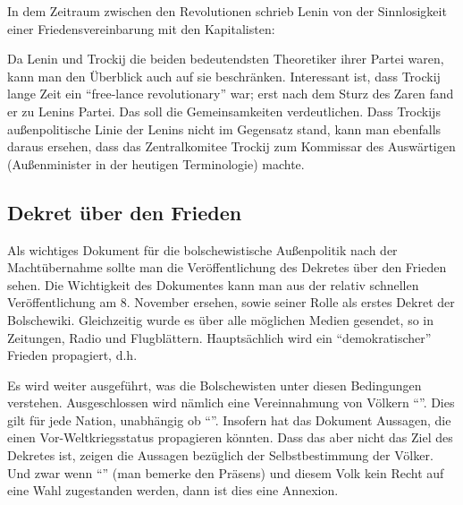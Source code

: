 \documentclass{../../sem_paper}
\begin{document}
In dem Zeitraum zwischen den Revolutionen schrieb Lenin von der Sinnlosigkeit einer Friedensvereinbarung mit den Kapitalisten:
\begin{quotation}
\autocite[97]{lenin_voj}
\end{quotation}

Da Lenin und Trockij die beiden bedeutendsten Theoretiker ihrer Partei waren, kann man den Überblick auch auf sie beschränken. Interessant ist, dass Trockij lange Zeit ein "`free-lance revolutionary"'\autocite[13]{debo1979} war; erst nach dem Sturz des Zaren fand er zu Lenins Partei. Das soll die Gemeinsamkeiten verdeutlichen. Dass Trockijs außenpolitische Linie der Lenins nicht im Gegensatz stand, kann man ebenfalls daraus ersehen, dass das Zentralkomitee Trockij zum Kommissar des Auswärtigen (Außenminister in der heutigen Terminologie) machte.

\subsection{Dekret über den Frieden}
\label{sec: dekret}
Als wichtiges Dokument für die bolschewistische Außenpolitik nach der Machtübernahme sollte man die Veröffentlichung des Dekretes über den Frieden sehen. Die Wichtigkeit des Dokumentes kann man aus der relativ schnellen Veröffentlichung am 8. November ersehen, sowie seiner Rolle als erstes Dekret der Bolschewiki. Gleichzeitig wurde es über alle möglichen Medien gesendet, so in Zeitungen, Radio und Flugblättern. Hauptsächlich wird ein "`demokratischer"' Frieden propagiert, d.h.
\begin{quotation}
\autocite[12]{dekret}
  \end{quotation}
Es wird weiter ausgeführt, was die Bolschewisten unter diesen Bedingungen verstehen. Ausgeschlossen wird nämlich eine Vereinnahmung von Völkern  "`"'\autocite[12]{dekret}. Dies gilt für jede Nation, unabhängig ob "`"'\autocite[12]{dekret}.
Insofern hat das Dokument Aussagen, die einen Vor-Weltkriegsstatus propagieren könnten.
Dass das aber nicht das Ziel des Dekretes ist, zeigen die Aussagen bezüglich der Selbstbestimmung der Völker. Und zwar wenn "`"'\autocite[12]{dekret} (man bemerke den Präsens) und diesem Volk kein Recht auf eine Wahl zugestanden werden, dann ist dies eine Annexion.
\end{document}
